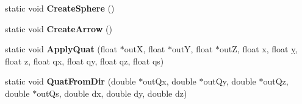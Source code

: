 \begin{DoxyCompactItemize}
\item 
\hypertarget{struct_c_quaternion_ext_aca82822c4160715f204b6ded07a33537}{static void {\bfseries Create\+Sphere} ()}\label{struct_c_quaternion_ext_aca82822c4160715f204b6ded07a33537}

\item 
\hypertarget{struct_c_quaternion_ext_a382383b05dc2aee8796466f6a5a30cea}{static void {\bfseries Create\+Arrow} ()}\label{struct_c_quaternion_ext_a382383b05dc2aee8796466f6a5a30cea}

\item 
\hypertarget{struct_c_quaternion_ext_a0bab7d198b0d872953927b0af6a2b301}{static void {\bfseries Apply\+Quat} (float $\ast$out\+X, float $\ast$out\+Y, float $\ast$out\+Z, float x, float \hyperlink{_ice_utils_8h_aa7ffaed69623192258fb8679569ff9ba}{y}, float z, float qx, float qy, float qz, float qs)}\label{struct_c_quaternion_ext_a0bab7d198b0d872953927b0af6a2b301}

\item 
\hypertarget{struct_c_quaternion_ext_a0a8d1f53561d7c4389b5163605fcd093}{static void {\bfseries Quat\+From\+Dir} (double $\ast$out\+Qx, double $\ast$out\+Qy, double $\ast$out\+Qz, double $\ast$out\+Qs, double dx, double dy, double dz)}\label{struct_c_quaternion_ext_a0a8d1f53561d7c4389b5163605fcd093}

\end{DoxyCompactItemize}
